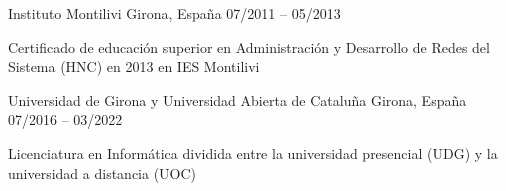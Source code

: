 \documentclass[]{awesome-cv}
\begin{document}
\vspace{8mm}
\begin{cventries}
	\vspace{2mm}
	\cventry
	{}
	{Instituto Montilivi \vspace{-5mm}}
	{Girona, España \vspace{-5mm}}
	{07/2011 – 05/2013 \vspace{-5mm}}
	{\begin{cvsectionnormaltext} 
		\item{Certificado de educación superior en Administración y Desarrollo de Redes del Sistema (HNC) en 2013 en IES Montilivi}
	\end{cvsectionnormaltext}}

 \cventry
	{}
	{Universidad de Girona y Universidad Abierta de Cataluña \vspace{-5mm}}
	{Girona, España \vspace{-5mm}}
	{07/2016 – 03/2022 \vspace{-5mm}}
	{\begin{cvsectionnormaltext} 
		\item{Licenciatura en Informática dividida entre la universidad presencial (UDG) y la universidad a distancia (UOC)}
	\end{cvsectionnormaltext}}
\end{cventries}
\end{document}
